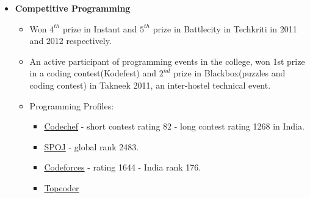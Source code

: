 \documentclass[margin,line]{resume}
\begin{document}
\begin{resume}
\begin{itemize}
    \item  \textbf{\textsf Competitive Programming}
      \begin{itemize}
      \item Won $4^{th}$ prize in Instant and $5^{th}$ prize in Battlecity in Techkriti in 2011 and 2012 respectively.
      \item An active participant of programming events in the college, won 1st prize in a coding contest(Kodefest) and
        $2^{nd}$ prize in Blackbox(puzzles and coding contest) in Takneek 2011, an inter-hostel technical event.
      \item Programming Profiles:
        \begin{itemize}
        \item \href{http://codechef.com/users/rishabhnigam31}{Codechef} - short contest rating 82 - long contest rating 1268 in India.
        \item \href{http://spoj.com/users/reincarnated}{SPOJ} - global rank 2483.
        \item \href{http://codeforces.com/profile/rishabhnigam31}{Codeforces} - rating 1644 - India rank 176.
        \item \href{}{Topcoder}
        \end{itemize}
      \end{itemize}

    \end{itemize}



\end{resume}
\end{document}
